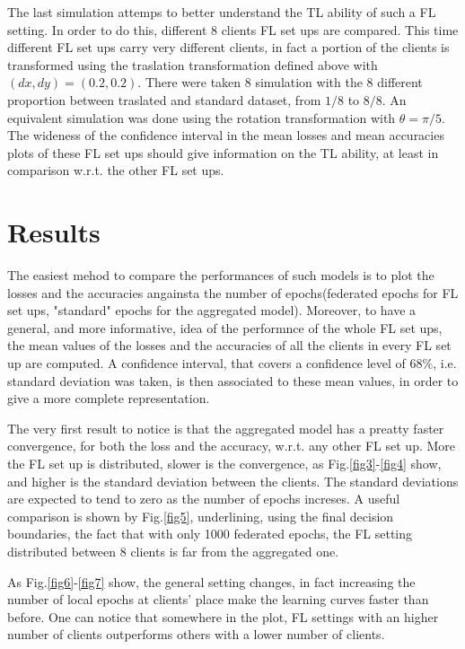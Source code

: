 \documentclass{article} %
\newcounter{other}
\newcounter{late}
\begin{document}
The last simulation attemps to better understand the TL ability of such a FL setting.
In order to do this, different 8 clients FL set ups are compared.
This time different FL set ups carry very different clients, in fact a portion of the clients 
is transformed using the traslation transformation defined above with $(dx, dy)=(0.2, 0.2)$.
There were taken 8 simulation with the 8 different proportion between traslated and standard 
dataset, from $1/8$ to $8/8$.
An equivalent simulation was done using the rotation transformation with $\theta=\pi/5$.
The wideness of the confidence interval in the mean losses and mean accuracies 
plots of these FL set ups should give information on the TL ability, at least in 
comparison w.r.t. the other FL set ups.

\section {Results}
The easiest mehod to compare the performances of such models is to plot 
the losses and the accuracies angainsta the number of epochs(federated epochs for FL set 
ups, "standard" epochs for the aggregated model).
Moreover, to have a general, and more informative, idea of the performnce of the whole FL 
set ups, the mean values of the losses and the accuracies of all the clients in every FL 
set up are computed.
A confidence interval, that covers a confidence level of $68\%$, i.e. standard deviation
was taken, is then associated to these mean values, in order to give a more complete 
representation.

The very first result to notice is that the aggregated model has a preatty faster convergence,
for both the loss and the accuracy, w.r.t. any other FL set up.
More the FL set up is distributed, slower is the convergence, as Fig.\ref{fig3}-\ref{fig4} show, and 
higher is the standard deviation between the clients.
The standard deviations are expected to tend to zero as the number of epochs increses.
A useful comparison is shown by Fig.\ref{fig5}, underlining, using the final decision 
boundaries, the fact that with only 1000 federated epochs, the FL setting distributed 
between 8 clients is far from the aggregated one.

As Fig.\ref{fig6}-\ref{fig7} show, the general setting changes, in fact increasing the number of local epochs 
at clients' place make the learning curves faster than before.
One can notice that somewhere in the plot, FL settings with an higher number of clients 
outperforms others with a lower number of clients.
\end{document}
